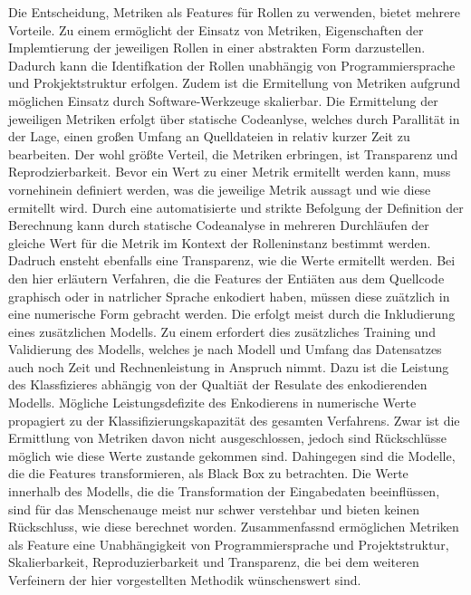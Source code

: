 Die Entscheidung, Metriken als Features für Rollen zu verwenden, bietet mehrere Vorteile. Zu einem ermöglicht der Einsatz von Metriken, Eigenschaften der Implemtierung der jeweiligen Rollen in einer abstrakten Form darzustellen.
Dadurch kann die Identifkation der Rollen unabhängig von Programmiersprache und Prokjektstruktur erfolgen. Zudem ist die Ermitellung von Metriken aufgrund möglichen Einsatz durch Software-Werkzeuge skalierbar. Die Ermittelung der jeweiligen Metriken erfolgt über statische Codeanlyse, welches durch Parallität in der Lage,
einen großen Umfang an Quelldateien in relativ kurzer Zeit zu bearbeiten. Der wohl größte Verteil, die Metriken erbringen, ist Transparenz und Reprodzierbarkeit.
Bevor ein Wert zu einer Metrik ermitellt werden kann, muss vornehinein definiert werden, was die jeweilige Metrik aussagt und wie diese ermitellt wird. Durch eine automatisierte und strikte Befolgung der Definition der Berechnung kann durch statische Codeanalyse in mehreren Durchläufen der gleiche Wert für die Metrik im Kontext der Rolleninstanz bestimmt werden.
Dadruch ensteht ebenfalls eine Transparenz, wie die Werte ermitellt werden. Bei den hier erläutern Verfahren, die die Features der Entiäten aus dem Quellcode graphisch oder in natrlicher Sprache enkodiert haben, müssen diese zuätzlich in eine numerische Form gebracht werden.
Die erfolgt meist durch die Inkludierung eines zusätzlichen Modells. Zu einem erfordert dies zusätzliches Training und Validierung des Modells, welches je nach Modell und Umfang das Datensatzes auch noch Zeit und Rechnenleistung in Anspruch nimmt. Dazu ist die Leistung des Klassfizieres abhängig von der Qualtiät der Resulate des enkodierenden Modells. Mögliche Leistungsdefizite des Enkodierens in numerische Werte propagiert zu der Klassifizierungskapazität des gesamten Verfahrens.
Zwar ist die Ermittlung von Metriken davon nicht ausgeschlossen, jedoch sind Rückschlüsse möglich wie diese Werte zustande gekommen sind. Dahingegen sind die Modelle, die die Features transformieren, als Black Box zu betrachten. Die Werte innerhalb des Modells, die die Transformation der Eingabedaten beeinflüssen, sind für das Menschenauge meist nur schwer verstehbar und bieten keinen Rückschluss, wie diese berechnet worden.
Zusammenfassnd ermöglichen Metriken als Feature eine Unabhängigkeit von Programmiersprache und Projektstruktur, Skalierbarkeit, Reproduzierbarkeit und Transparenz, die bei dem weiteren Verfeinern der hier vorgestellten Methodik wünschenswert sind.

\pagebreak

